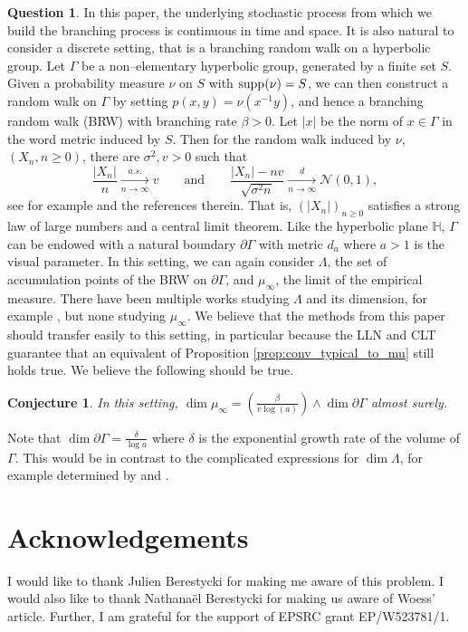 \documentclass{article}
\newtheorem*{conj}{Conjecture}
\theoremstyle{definition}
\newtheorem{quest}[thm]{Question}
\numberwithin{equation}{section}
\numberwithin{thm}{section}
\newcommand*{\HH}{\ensuremath{\mathbb{H}}}	        	%
\newcommand*{\supp}{\ensuremath{\mathrm{supp} \ }}	        %
\begin{document}
\begin{quest}
    In this paper, the underlying stochastic process from which we build the branching process is continuous in time and space. It is also natural to consider a discrete setting, that is a branching random walk on a hyperbolic group. Let $\Gamma$ be a non--elementary hyperbolic group, generated by a finite set $S$. Given a probability measure $\nu$ on $S$ with $\supp \hspace{-3pt}(\nu) =S$, we can then construct a random walk on $\Gamma$ by setting $p(x,y)=\nu(x^{-1}y)$, and hence a branching random walk (BRW) with {branching} rate $\beta>0$. Let $\vert x \vert$ be the norm of $x\in \Gamma$ in the word metric induced by $S$. Then for the random walk induced by $\nu$, $(X_n,n\geq 0)$, there {are} $\sigma^2,v>0$ such that
    \begin{equation*}
            \frac{\vert X_n\vert}{n}\xrightarrow[n\to\infty]{a.s.}v \qquad \text{and} \qquad
            \frac{\vert X_n\vert - nv}{\sqrt{\sigma^2n}} \xrightarrow[n\to \infty]{d} \mathcal{N}(0,1),
    \end{equation*}
    see for example \cite{bjorklund_central_2010} and the references therein.
    That is, $(\vert X_n\vert)_{n\geq 0}$ satisfies a strong law of large numbers and a central limit theorem. Like the hyperbolic plane $\HH$, $\Gamma$ can be endowed with a natural boundary $\partial \Gamma$ with metric $d_a$ where $a>1$ is the visual parameter. In this setting, we can again consider $\Lambda$, the set of accumulation points of the BRW on $\partial \Gamma$, and $\mu_\infty$, the limit of the empirical measure. There have been multiple works studying $\Lambda$ and its dimension, for example \cite{sidoravicius_limit_2023}, but none studying $\mu_\infty$. We believe that the methods from this paper {should} transfer easily to this setting, in particular because the LLN and CLT guarantee that an equivalent of Proposition \ref{prop:conv_typical_to_mu} still holds true. We believe the following should be true. 

    \begin{conj}
        In this setting, $\dim  \mu_\infty = \left(\frac{\beta}{v\log(a)} \right)\wedge \dim \partial \Gamma$ almost surely. 
    \end{conj}

    Note that $\dim \partial \Gamma = \frac{\delta}{\log a}$ where $\delta$ is the exponential growth rate of the volume of $\Gamma$. This would be in contrast to the complicated expressions for $\dim \Lambda$, for example determined by \cite{sidoravicius_limit_2023} and \cite{hueter_anisotropic_2000}.
\end{quest}

\section*{Acknowledgements}

I would like to thank Julien Berestycki for making me aware of this problem. I would also like to thank Nathanaël Berestycki for making us aware of Woess' article. 
Further, I am grateful for the support of EPSRC grant EP/W523781/1.

\printbibliography[heading=bibintoc]
\end{document}
